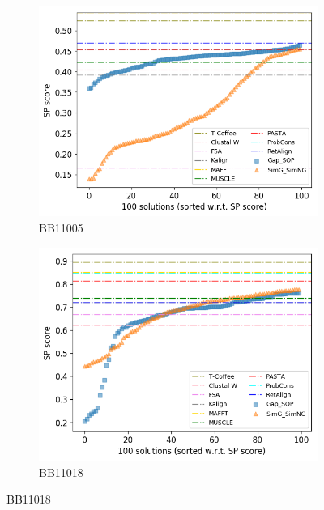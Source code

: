 \begin{figure}[!htbp]
	\begin{adjustwidth}{-1cm}{-1cm}
	\centering
		\begin{subfigure}{0.22\textwidth}
			\includegraphics[width=\columnwidth]{Figure/summary/precomputedInit/Balibase/BB11005_pairs_density_single_run_2}
			\caption{BB11005}
		\end{subfigure}	
		\begin{subfigure}{0.22\textwidth}
			\includegraphics[width=\columnwidth]{Figure/summary/precomputedInit/Balibase/BB11018_pairs_density_single_run_2}
			\caption{BB11018}
		\end{subfigure}

\end{adjustwidth}
\end{figure}
